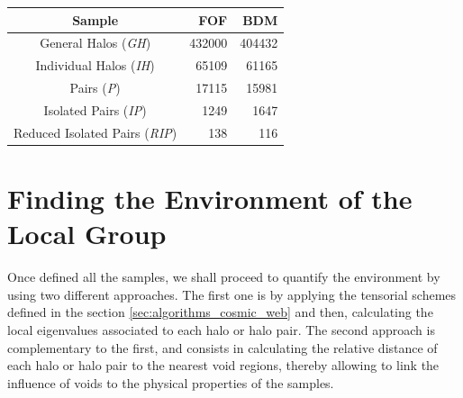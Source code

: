 \documentclass[usenatbib]{latex/mn2e}
\begin{document}
\begin{table}[H]
\begin{flushleft}
\begin{center}
  \begin{tabular}{c  r  r} \hline
	\textbf{Sample}					&\textbf{FOF}&\textbf{BDM} \\ \hline\hline
	General Halos (\textit{GH}) 	& 432000	 & 404432  \\ 
	Individual Halos (\textit{IH}) 	& 65109		 & 61165  \\ 
	Pairs (\textit{P}) 	 			& 17115		 & 15981  \\ 
	Isolated Pairs (\textit{IP})	& 1249		 & 1647  \\ 
	Reduced Isolated Pairs (\textit{RIP})& 138	 & 116  \\ \hline
  \end{tabular}  
  
  \label{Tab:Samples_Size}
  
\end{center}
\end{flushleft}
\end{table}


\section{Finding the Environment of the Local Group}
\label{sec:LGEnvironment}



Once defined all the samples, we shall proceed to quantify the environment
by using two different approaches. The first one is by applying the 
tensorial schemes defined in the section \ref{sec:algorithms_cosmic_web} 
and then, calculating the local eigenvalues associated to each halo or halo 
pair. The second approach is complementary to the first, and consists in 
calculating the relative distance of each halo or halo pair to the nearest
void regions, thereby allowing to link the influence of voids to the 
physical properties of the samples.
\end{document}
